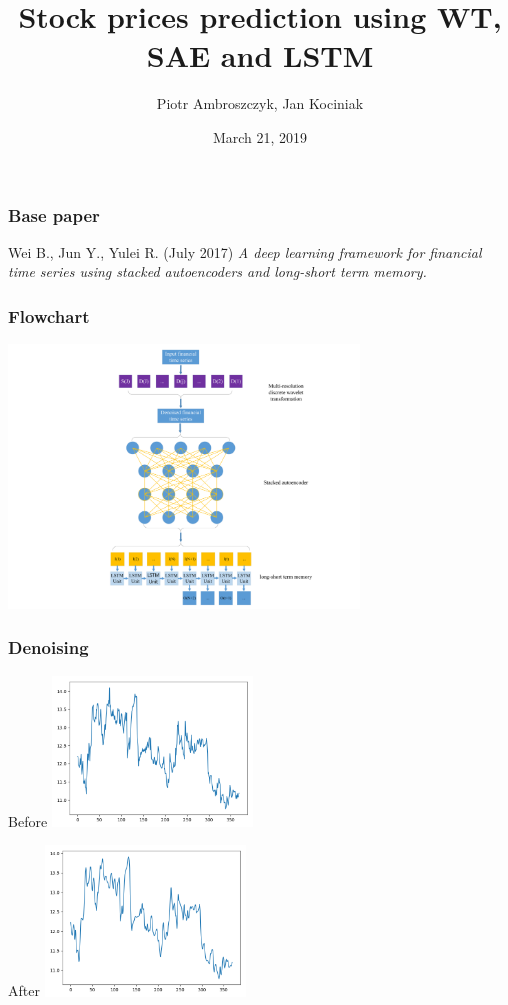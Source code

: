 \documentclass{beamer}
\begin{document}
\title{Stock prices prediction using WT, SAE and LSTM}
\author{Piotr Ambroszczyk, Jan Kociniak}
\date{March 21, 2019}

\begin{frame}
\titlepage
\end{frame}

\begin{frame}
\frametitle{Base paper}
Wei B., Jun Y., Yulei R. (July 2017) \textit{A deep learning framework for financial time series using stacked autoencoders and long-short term memory.}
\end{frame}

\begin{frame}
\frametitle{Flowchart}
\begin{center}
\includegraphics[height=7cm]{flowchart.png}
\end{center}
\end{frame}

\begin{frame}
\frametitle{Denoising}
\begin{minipage}{0.475\textwidth}
\hspace{14pt}Before\vspace{5pt}
\includegraphics[height=4cm]{before_denoising.png}
\end{minipage}\hspace{10pt}
\begin{minipage}{0.475\textwidth}
\hspace{14pt}After\vspace{5pt}
\includegraphics[height=4cm]{after_denoising.png}
\end{minipage}
\end{frame}
\end{document}
